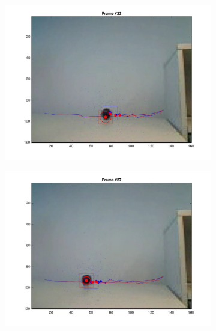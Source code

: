 \documentclass{ethz_report}
\begin{document}
\begin{figure}[h]
\begin{subfigure}[b]{.25\textwidth}
        \includegraphics[width=1\linewidth]{images/video3_bins_low_21}
    \end{subfigure}%
    \begin{subfigure}[b]{.25\textwidth}
        \centering
        \includegraphics[width=1\linewidth]{images/video3_bins_low_26}
    \end{subfigure}%
    \begin{subfigure}[b]{.25\textwidth}
        \centering

\end{subfigure}
\end{figure}
\end{document}

